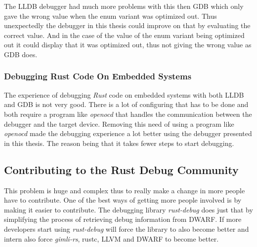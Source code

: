 The \gls{LLDB} debugger had much more problems with this then \gls{GDB} which only gave the wrong value when the enum variant was optimized out.
Thus unexpectedly the debugger in this thesis could improve on that by evaluating the correct value.
And in the case of the value of the  enum variant being optimized out it could display that it was optimized out, thus not giving the wrong value as \gls{GDB} does.


\subsubsection{Debugging Rust Code On Embedded Systems}
The experience of debugging \emph{Rust} code on embedded systems with both \gls{LLDB} and \gls{GDB} is not very good.
There is a lot of configuring that has to be done and both require a program like \emph{openocd} that handles the communication between the debugger and the target device.
Removing this need of using a program like \emph{openocd} made the debugging experience a lot better using the debugger presented in this thesis.
The reason being that it takes fewer steps to start debugging.


\subsection{Contributing to the Rust Debug Community}
This problem is huge and complex thus to really make a change in more people have to contribute.
One of the best ways of getting more people involved is by making it easier to contribute.
The debugging library \emph{rust-debug} does just that by simplifying the process of retrieving debug information from \gls{DWARF}.
If more developers start using \emph{rust-debug} will force the library to also become better and intern also force \emph{gimli-rs}, \gls{rustc}, \gls{LLVM} and \gls{DWARF} to become better.

